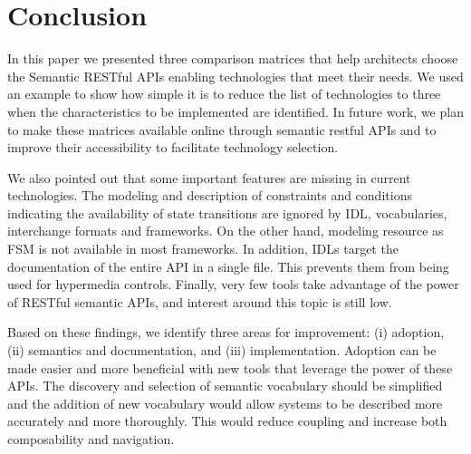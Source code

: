 \section{Conclusion}


In this paper we presented three comparison matrices that help architects choose the Semantic RESTful APIs enabling technologies that meet their needs.
We used an example to show how simple it is to reduce the list of technologies to three when the characteristics to be implemented are identified.
In future work, we plan to make these matrices available online through semantic restful APIs and to improve their accessibility to facilitate technology selection.

We also pointed out that some important features are missing in current technologies. The modeling and description of constraints and conditions indicating the availability of state transitions are ignored by IDL, vocabularies, interchange formats and frameworks. On the other hand, modeling resource as FSM is not available in most frameworks. In addition, IDLs target the documentation of the entire API in a single file. This prevents them from being used for hypermedia controls. Finally, very few tools take advantage of the power of RESTful semantic APIs, and interest around this topic is still low.

Based on these findings, we identify three areas for improvement: (i) adoption, (ii) semantics and documentation, and (iii) implementation. Adoption can be made easier and more beneficial with new tools that leverage the power of these APIs. The discovery and selection of semantic vocabulary should be simplified and the addition of new vocabulary would allow systems to be described more accurately and more thoroughly. This would reduce coupling and increase both composability and navigation.


